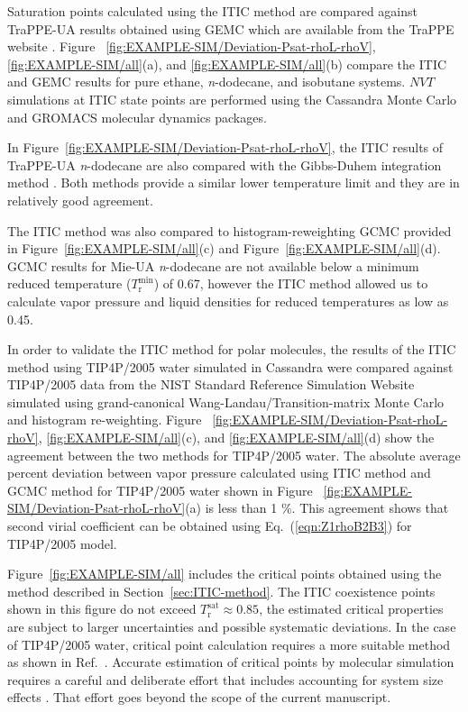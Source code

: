 \documentclass[5p,times]{elsarticle}
\begin{document}
Saturation points calculated using the ITIC method are compared against TraPPE-UA results obtained using GEMC which are available from the TraPPE website \cite{eggimann2014}. Figure~ \ref{fig:EXAMPLE-SIM/Deviation-Psat-rhoL-rhoV}, \ref{fig:EXAMPLE-SIM/all}(a), and \ref{fig:EXAMPLE-SIM/all}(b) compare the ITIC and GEMC results for pure ethane, \textit{n}-dodecane, and isobutane systems. $NVT$ simulations at ITIC state points are performed using the Cassandra Monte Carlo \cite{Shah2017} and GROMACS molecular dynamics \cite{Lindahl2001} packages. 

In Figure~\ref{fig:EXAMPLE-SIM/Deviation-Psat-rhoL-rhoV}, the ITIC results of TraPPE-UA \textit{n}-dodecane are also compared with the Gibbs-Duhem integration method \cite{Ungerer2000}. Both methods provide a similar lower temperature limit and they are in relatively good agreement.

The ITIC method was also compared to histogram-reweighting GCMC provided in Figure~\ref{fig:EXAMPLE-SIM/all}(c) and Figure~\ref{fig:EXAMPLE-SIM/all}(d). GCMC results for Mie-UA \textit{n}-dodecane are not available below a minimum reduced temperature ($T_\mathrm{r}^{\mathrm{min}}$) of 0.67, however the ITIC method allowed us to calculate vapor pressure and liquid densities for reduced temperatures as low as 0.45. 

In order to validate the ITIC method for polar molecules, the results of the ITIC method using TIP4P/2005 water simulated in Cassandra were compared against TIP4P/2005 data from the NIST Standard Reference Simulation Website \cite{Shen2008} simulated using grand-canonical Wang-Landau/Transition-matrix Monte Carlo and histogram re-weighting. Figure~ \ref{fig:EXAMPLE-SIM/Deviation-Psat-rhoL-rhoV}, \ref{fig:EXAMPLE-SIM/all}(c), and \ref{fig:EXAMPLE-SIM/all}(d) show the agreement between the two methods for TIP4P/2005 water. The absolute average percent deviation between vapor pressure calculated using ITIC method and GCMC method for TIP4P/2005 water shown in Figure~ \ref{fig:EXAMPLE-SIM/Deviation-Psat-rhoL-rhoV}(a) is less than 1 \%. This agreement shows that second virial coefficient can be obtained using Eq.~(\ref{eqn:Z1rhoB2B3}) for TIP4P/2005 model.

Figure~\ref{fig:EXAMPLE-SIM/all} includes the critical points obtained using the method described in Section~\ref{sec:ITIC-method}. The ITIC coexistence points 
shown in this figure do not exceed $T_\mathrm{r}^\mathrm{sat} \approx 0.85$, the estimated critical properties are subject to larger uncertainties and possible systematic deviations. In the case of TIP4P/2005 water, critical point calculation requires a more suitable method as shown in Ref.~\cite{Vega2006}. Accurate estimation of critical points by molecular simulation requires a careful and deliberate effort that includes accounting for system size effects \cite{orkoulas2001precise}. That effort goes beyond the scope of the current manuscript.
\end{document}
